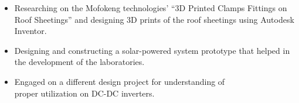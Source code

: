 \documentclass[10pt,a4paper,ragged2e]{altacv}
\begin{document}
\begin{itemize}
\item Researching on the Mofokeng technologies' ``3D Printed Clamps Fittings on Roof Sheetings''
and designing 3D prints of the roof sheetings using Autodesk Inventor.

\end{itemize}


\divider



\begin{itemize}
\item Designing and constructing a solar-powered system prototype that helped in the development of the laboratories.
\item Engaged on a different design project for understanding of\\ proper utilization on DC-DC inverters.
\end{itemize}


\end{document}
